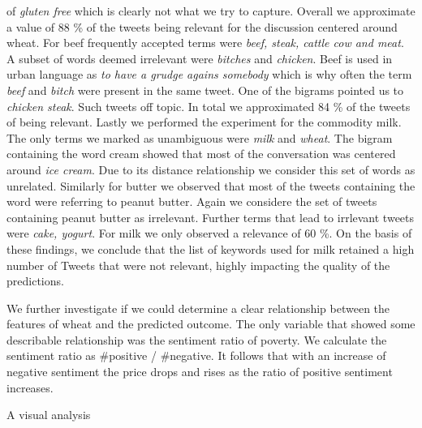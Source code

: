 of \emph{gluten free} which is clearly not what we try to capture. Overall we approximate a value of 88 \%  of the tweets being relevant for the discussion centered around wheat. For beef frequently accepted terms were \emph{beef, steak, cattle cow and meat}. A subset of words deemed irrelevant were \emph{bitches} and \emph{chicken}. Beef is used in urban language as \emph{to have a grudge agains somebody} which is why often the term \emph{beef} and \emph{bitch} were present in the same tweet. One of the bigrams pointed us to \emph{chicken steak}. Such tweets off topic. In total we approximated 84 \% of the tweets of being relevant. 
Lastly we performed the experiment for the commodity milk. The only terms we marked as unambiguous were \emph{milk} and \emph{wheat}. The bigram containing the word cream showed that most of the conversation was centered around \emph{ice cream}. Due to its distance relationship we consider this set of words as unrelated. Similarly for butter we observed that most of the tweets containing the word were referring to peanut butter. Again we considere the set of tweets containing peanut butter as irrelevant. Further terms that lead to irrlevant tweets were \emph{cake, yogurt}. For milk we only observed a relevance of 60 \%.  On the basis of these findings, we conclude that the list of keywords used for milk retained a high number of Tweets that were not relevant,  highly impacting the quality of the predictions. 

We further investigate if we could determine a clear relationship between the features of wheat and the predicted outcome. The only variable that showed some describable relationship was the sentiment ratio of poverty. We calculate the sentiment ratio as \#positive / \#negative. It follows that with an increase of negative sentiment the price drops and rises as the ratio of positive sentiment increases. 


 A visual analysis 






